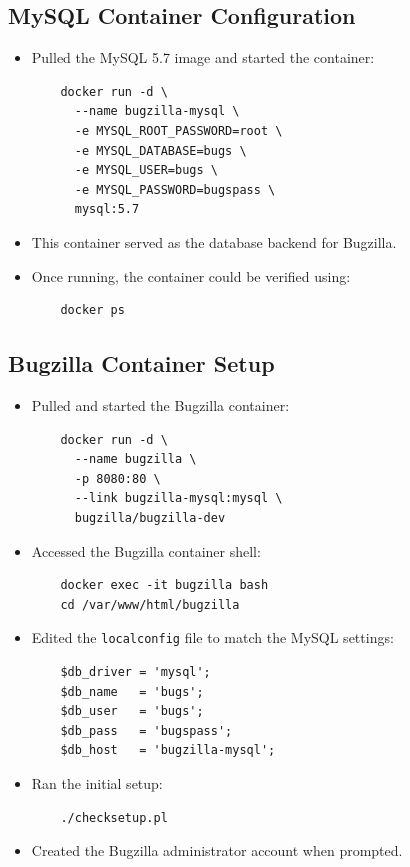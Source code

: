 \subsection{MySQL Container Configuration}
\begin{itemize}
    \item Pulled the MySQL 5.7 image and started the container:
    \begin{verbatim}
    docker run -d \
      --name bugzilla-mysql \
      -e MYSQL_ROOT_PASSWORD=root \
      -e MYSQL_DATABASE=bugs \
      -e MYSQL_USER=bugs \
      -e MYSQL_PASSWORD=bugspass \
      mysql:5.7
    \end{verbatim}
    \item This container served as the database backend for Bugzilla.
    \item Once running, the container could be verified using:
    \begin{verbatim}
    docker ps
    \end{verbatim}
\end{itemize}

\subsection{Bugzilla Container Setup}
\begin{itemize}
    \item Pulled and started the Bugzilla container:
    \begin{verbatim}
    docker run -d \
      --name bugzilla \
      -p 8080:80 \
      --link bugzilla-mysql:mysql \
      bugzilla/bugzilla-dev
    \end{verbatim}
    \item Accessed the Bugzilla container shell:
    \begin{verbatim}
    docker exec -it bugzilla bash
    cd /var/www/html/bugzilla
    \end{verbatim}
    \item Edited the \texttt{localconfig} file to match the MySQL settings:
    \begin{verbatim}
    $db_driver = 'mysql';
    $db_name   = 'bugs';
    $db_user   = 'bugs';
    $db_pass   = 'bugspass';
    $db_host   = 'bugzilla-mysql';
    \end{verbatim}
    \item Ran the initial setup:
    \begin{verbatim}
    ./checksetup.pl
    \end{verbatim}
    \item Created the Bugzilla administrator account when prompted.
\end{itemize}

